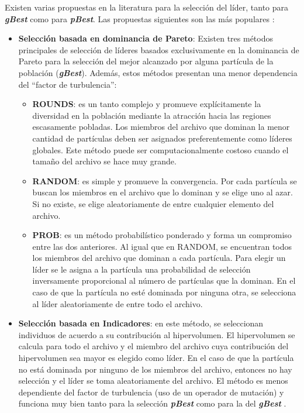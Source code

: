   Existen varias propuestas en la literatura para la selecci\'on del l\'ider, tanto para \textbf{\textit{gBest}} como para 
  \textbf{\textit{pBest}}. Las propuestas siguientes son las m\'as populares \cite{Nik11}:

  \begin{itemize}
   \item \textbf{Selecci\'on basada en dominancia de Pareto}: Existen tres m\'etodos principales de selecci\'on de l\'ideres 
   basados exclusivamente en la dominancia de Pareto para la selecci\'on del mejor alcanzado por alguna 
   part\'icula de la poblaci\'on (\textbf{\textit{gBest}}). Adem\'as, estos m\'etodos presentan una menor dependencia del 
   ``factor de turbulencia'':
   
    \begin{itemize}
     \item \textbf{ROUNDS}: es un tanto complejo y promueve expl\'icitamente la diversidad en la poblaci\'on mediante la 
     atracci\'on hacia las regiones escasamente pobladas. Los miembros del archivo que dominan la menor cantidad de 
     part\'iculas deben ser asignados preferentemente como l\'ideres globales. Este m\'etodo puede ser computacionalmente 
     costoso cuando el tama\~no del archivo se hace muy grande.
     \item \textbf{RANDOM}: es simple y promueve la convergencia. Por cada part\'icula se buscan los miembros en el archivo 
     que lo dominan y se elige uno al azar. Si no existe, se elige aleatoriamente de entre cualquier elemento del archivo.    
     \item \textbf{PROB}: es un m\'etodo probabil\'istico ponderado y forma un compromiso entre las dos anteriores. Al igual 
     que en RANDOM, se encuentran todos los miembros del archivo que dominan a cada part\'icula. Para elegir un l\'ider se 
     le asigna a la part\'icula una probabilidad de selecci\'on inversamente proporcional al n\'umero de part\'iculas que 
     la dominan. En el caso de que la part\'icula no est\'e dominada por ninguna otra, se selecciona al l\'ider aleatoriamente
     de entre todo el archivo.
    \end{itemize}

    \item \textbf{Selecci\'on basada en Indicadores}: en este m\'etodo, se seleccionan individuos de acuerdo a su contribuci\'on
    al hipervolumen. El hipervolumen se calcula para todo el archivo y el miembro del archivo cuya contribuci\'on del hipervolumen
    sea mayor es elegido como l\'ider. En el caso de que la part\'icula no est\'a dominada por ninguno de los miembros del 
    archivo, entonces no hay selecci\'on y el l\'ider se toma aleatoriamente del archivo. El m\'etodo es menos dependiente del
    factor de turbulencia (uso de un operador de mutaci\'on) y funciona muy bien tanto para la selecci\'on \textbf{\textit{pBest}}
    como para la del \textbf{\textit{gBest}} \cite{Parallel}.
  \end{itemize}
  
